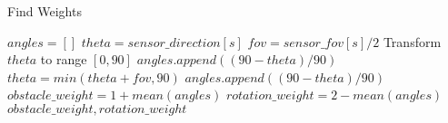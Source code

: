 \begin{algorithm}[!htb]
\caption{Find Weights}
\label{alg:find_weights_with_modes}
\begin{algorithmic}[1]
        \State $angles = []$
            \State $theta = sensor\_direction[s]$
            \State $fov = sensor\_fov[s]/2$
            \State Transform $theta$ to range $[0,90]$
                \State $angles.append((90-theta)/90)$
                \State $theta = min(theta+fov, 90)$
                \State $angles.append((90-theta)/90)$
            \EndIf
        \EndFor
        \State $obstacle\_weight = 1 + mean(angles)$
        \State $rotation\_weight = 2 - mean(angles)$
        \State \Return $obstacle\_weight, rotation\_weight$
\end{algorithmic}
\end{algorithm}